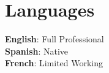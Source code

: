 \documentclass[letterpaper,11pt]{article}
\begin{document}
\section{Languages}
 \begin{itemize}[leftmargin=0.15in, label={}]
    \small{\item{
     \textbf{English}{:  Full Professional} \\
     \textbf{Spanish}{:  Native} \\
     \textbf{French}{:  Limited Working} \\
    }}
 \end{itemize}

\end{document}
